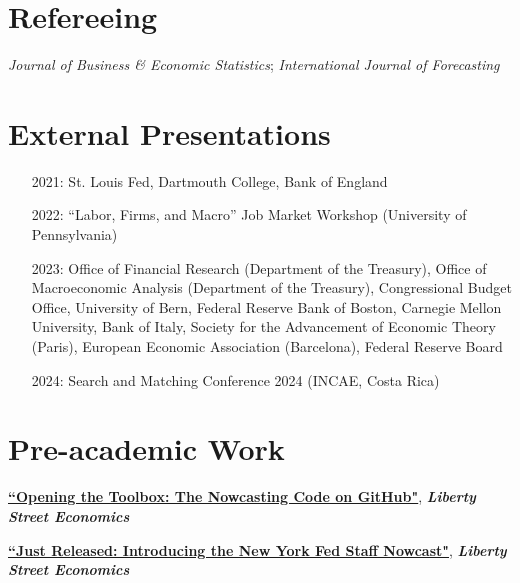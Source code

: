 \documentclass[margin,line]{res}                          %
\newenvironment{list1}{
	\begin{list}{\ding{113}}{%
			\setlength{\itemsep}{0in}
			\setlength{\parsep}{0in} \setlength{\parskip}{0in}
			\setlength{\topsep}{0in} \setlength{\partopsep}{0in}
			\setlength{\leftmargin}{0.17in}}}{\end{list}}
\begin{document}
\begin{resume}
	\section{\sc Refereeing}
	\begin{list1}
		\item[] \emph{Journal of Business \& Economic Statistics}; \emph{International Journal of Forecasting} \smallskip
	\end{list1}
	
	\section{\sc External Presentations}
	\begin{list1}
		\item[]
		\begin{itemize}\setlength{\itemindent}{.3cm}
			\item[2021:]\makebox[0.1cm]{\hfill} St. Louis Fed, Dartmouth College, Bank of England\smallskip
			\item[2022:]\makebox[0.1cm]{\hfill} ``Labor, Firms, and Macro'' Job Market Workshop (University of Pennsylvania) \smallskip
			\item[2023:]\makebox[0.1cm]{\hfill} Office of Financial Research (Department of the Treasury), Office of Macroeconomic \hspace*{0.55cm}Analysis (Department of the Treasury), Congressional Budget Office, University of Bern, \hspace*{0.55cm}Federal Reserve Bank of Boston, Carnegie Mellon University, Bank of Italy,  Society for \hspace*{0.55cm}the Advancement of Economic Theory (Paris), European Economic Association (Barcelona),
			\hspace*{0.55cm}Federal Reserve Board\smallskip
			\item[2024:]\makebox[0.1cm]{\hfill} Search and Matching Conference 2024 (INCAE, Costa Rica)\smallskip
		\end{itemize}		
	\end{list1}
	
	\section{\sc Pre-academic Work} 
	\begin{list1}
		\item[] \href{https://libertystreeteconomics.newyorkfed.org/2018/08/opening-the-toolbox-the-nowcasting-code-on-github/}{\textbf{``Opening the Toolbox: The Nowcasting Code on GitHub"}}, \textit{\textbf{Liberty Street Economics}}  \smallskip
		\item[] \href{https://libertystreeteconomics.newyorkfed.org/2016/04/just-released-introducing-the-frbny-nowcast/}{\textbf{``Just Released: Introducing the New York Fed Staff Nowcast"}}, \textit{\textbf{Liberty Street Economics}} \smallskip            
	\end{list1}
	

\end{resume}
\end{document}
